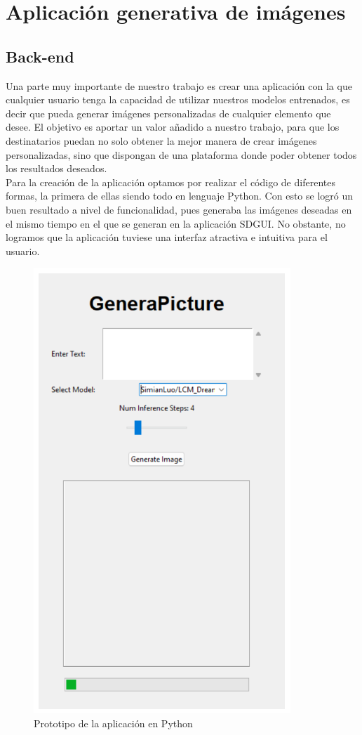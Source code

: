 \chapter{Aplicación generativa de imágenes}
\label{cap:aplicacion}

\section{Back-end}
Una parte muy importante de nuestro trabajo es crear una aplicación con la que cualquier usuario tenga la capacidad de utilizar nuestros modelos entrenados, es decir que pueda generar imágenes personalizadas de cualquier elemento que desee. El objetivo es aportar un valor añadido a nuestro trabajo, para que los destinatarios puedan no solo obtener la mejor manera de crear imágenes personalizadas, sino que dispongan de una plataforma donde poder obtener todos los resultados deseados.\\

Para la creación de la aplicación optamos por realizar el código de diferentes formas, la primera de ellas siendo todo en lenguaje Python. Con esto se logró un buen resultado a nivel de funcionalidad, pues generaba las imágenes deseadas en el mismo tiempo en el que se generan en la aplicación SDGUI. No obstante, no logramos que la aplicación tuviese una interfaz atractiva e intuitiva para el usuario.\\

\begin{figure}[!htb]
	\centering
	\includegraphics[width = 0.5
	\textwidth]{Imagenes/Vectorial/app1.png}
	\caption{Prototipo de la aplicación en Python}
	\label{fig:app1}
\end{figure}

